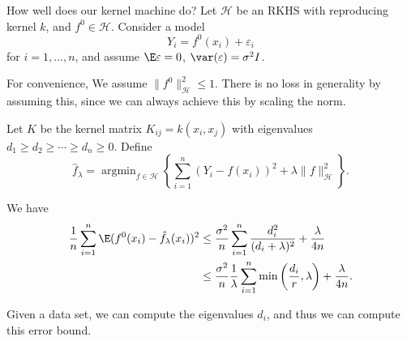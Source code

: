 \documentclass[a4paper]{article}
\DeclareMathOperator*\argmin{argmin}
\begin{document}
How well does our kernel machine do? Let $\mathcal{H}$ be an RKHS with reproducing kernel $k$, and $f^0 \in \mathcal{H}$. Consider a model
\[
  Y_i = f^0(x_i) + \varepsilon_i
\]
for $i = 1, \ldots, n$, and assume $\E \varepsilon = 0$, $\var(\varepsilon) = \sigma^2 I$.

For convenience, We assume $\|f^0\|^2_{\mathcal{H}} \leq 1$. There is no loss in generality by assuming this, since we can always achieve this by scaling the norm.

Let $K$ be the kernel matrix $K_{ij} = k(x_i, x_j)$ with eigenvalues $d_1 \geq d_2 \geq \cdots \geq d_n \geq 0$. Define
\[
  \hat{f}_\lambda = \argmin_{f \in \mathcal{H}} \left\{ \sum_{i = 1}^n (Y_i - f(x_i))^2 + \lambda \|f\|_\mathcal{H}^2\right\}.
\]
\begin{thm}
  We have
  \begin{align*}
    \frac{1}{n} \sum_{i = 1}^n \E(f^0(x_i) - \hat{f}_\lambda (x_i))^2 &\leq \frac{\sigma^2}{n} \sum_{i = 1}^n \frac{d_i^2}{(d_i + \lambda)^2} + \frac{\lambda}{4n}\\
    &\leq \frac{\sigma^2}{n} \frac{1}{\lambda} \sum_{i = 1}^n \min \left(\frac{d_i}{r}, \lambda\right) + \frac{\lambda}{4n}.
  \end{align*}
\end{thm}
Given a data set, we can compute the eigenvalues $d_i$, and thus we can compute this error bound.
\end{document}
